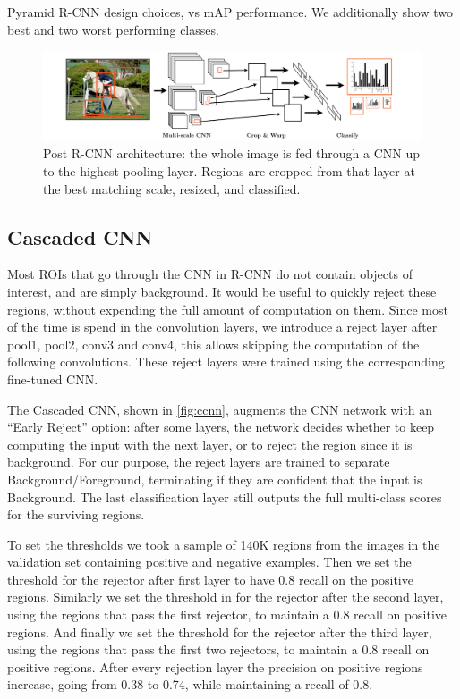 \begin{table}[ht]
\centering
\caption{
    Pyramid R-CNN design choices, vs mAP performance.
    We additionally show two best and two worst performing classes.
}\label{tab:prcnn}
\small{

}
\end{table}

\begin{figure}[h!]
\begin{center}
\includegraphics[width=0.98\columnwidth]{figures/dense_rcnn.pdf}
\caption{
Post R-CNN architecture: the whole image is fed through a CNN up to the highest pooling layer.
Regions are cropped from that layer at the best matching scale, resized, and classified.
}\label{fig:dense_rcnn}
\end{center}
\end{figure}

\subsection{Cascaded CNN}\label{sec:ccnn}

Most ROIs that go through the CNN in R-CNN do not contain objects of interest, and are simply background.
It would be useful to quickly reject these regions, without expending the full amount of computation on them. Since most of the time is spend in the convolution layers, we introduce a reject layer after pool1, pool2, conv3 and conv4, this allows skipping the computation of the following convolutions. These reject layers were trained using the corresponding fine-tuned CNN.

The Cascaded CNN, shown in \autoref{fig:ccnn}, augments the CNN network with an ``Early Reject'' option: after some layers, the network decides whether to keep computing the input with the next layer, or to reject the region since it is background.
For our purpose, the reject layers are trained to separate Background/Foreground, terminating if they are confident that the input is Background. The last classification layer still outputs the full multi-class scores for the surviving regions.

To set the thresholds we took a sample of 140K regions from the images in the validation set containing positive and negative examples. Then we set the threshold for the rejector after first layer to have 0.8 recall on the positive regions. Similarly we set the threshold in for the rejector after the second layer, using the regions that pass the first rejector, to maintain a 0.8 recall on positive regions. And finally we set the threshold for the rejector after the third layer, using the regions that pass the first two rejectors, to maintain a 0.8 recall on positive regions. After every rejection layer the precision on positive regions increase, going from 0.38 to 0.74, while maintaining a recall of 0.8.

